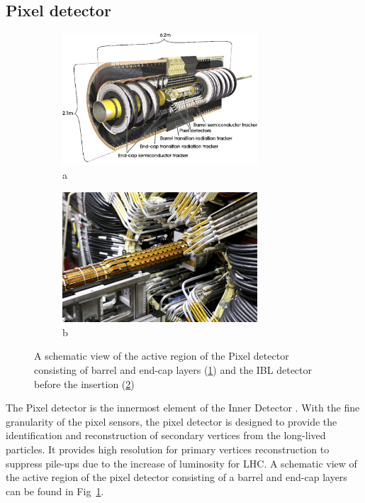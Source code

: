 \subsection{Pixel detector}
\label{sec:pixel}

\begin{figure}[htbp!]
\begin{subfigure}{.5\textwidth}
 \centering
 \includegraphics[width=0.8\textwidth]{chapters/c4/figures/pixel}
 \caption{a}
 \label{fig:pixel1}
\end{subfigure}%
\begin{subfigure}{.5\textwidth}
 \centering
 \includegraphics[width=0.8\textwidth]{chapters/c4/figures/IBL}
 \caption{b}
 \label{fig:pixel2}
\end{subfigure}
 \caption{A schematic view of the active region of the Pixel detector consisting of barrel and end-cap layers (\ref{fig:pixel1}) and the IBL detector before the insertion (\ref{fig:pixel2})}
\label{fig:pixel}
\end{figure}

\par The Pixel detector is the innermost element of the Inner Detector \cite{Hirono:2641635}. With the fine granularity of the pixel sensors, the pixel detector is designed to provide the identification and reconstruction of secondary vertices from the long-lived particles. It provides high resolution for primary vertices reconstruction to suppress pile-ups due to the increase of luminosity for LHC. A schematic view of the active region of the pixel detector consisting of a barrel and end-cap layers can be found in Fig~\ref{fig:pixel1}.

